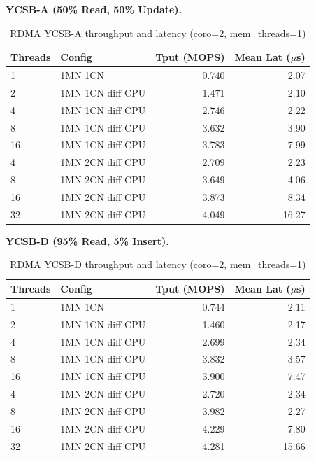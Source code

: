 \documentclass[conference]{IEEEtran}
\begin{document}
\textbf{YCSB-A (50\% Read, 50\% Update).}

\begin{table}[H]
\centering
\caption{RDMA YCSB-A throughput and latency (coro=2, mem\_threads=1)}
\label{tab:rdma-ycsba}
\small
\begin{tabular}{@{}llrr@{}}
\toprule
\textbf{Threads} & \textbf{Config} & \textbf{Tput (MOPS)} & \textbf{Mean Lat ($\mu$s)} \\
\midrule
1  & 1MN 1CN             & 0.740 & 2.07 \\
2  & 1MN 1CN diff CPU    & 1.471 & 2.10 \\
4  & 1MN 1CN diff CPU    & 2.746 & 2.22 \\
8  & 1MN 1CN diff CPU    & 3.632 & 3.90 \\
16 & 1MN 1CN diff CPU    & 3.783 & 7.99 \\
\midrule
4  & 1MN 2CN diff CPU    & 2.709 & 2.23 \\
8  & 1MN 2CN diff CPU    & 3.649 & 4.06 \\
16 & 1MN 2CN diff CPU    & 3.873 & 8.34 \\
32 & 1MN 2CN diff CPU    & 4.049 & 16.27 \\
\bottomrule
\end{tabular}
\end{table}

\textbf{YCSB-D (95\% Read, 5\% Insert).}

\begin{table}[H]
\centering
\caption{RDMA YCSB-D throughput and latency (coro=2, mem\_threads=1)}
\label{tab:rdma-ycsbd}
\small
\begin{tabular}{@{}llrr@{}}
\toprule
\textbf{Threads} & \textbf{Config} & \textbf{Tput (MOPS)} & \textbf{Mean Lat ($\mu$s)} \\
\midrule
1  & 1MN 1CN             & 0.744 & 2.11 \\
2  & 1MN 1CN diff CPU    & 1.460 & 2.17 \\
4  & 1MN 1CN diff CPU    & 2.699 & 2.34 \\
8  & 1MN 1CN diff CPU    & 3.832 & 3.57 \\
16 & 1MN 1CN diff CPU    & 3.900 & 7.47 \\
\midrule
4  & 1MN 2CN diff CPU    & 2.720 & 2.34 \\
8  & 1MN 2CN diff CPU    & 3.982 & 2.27 \\
16 & 1MN 2CN diff CPU    & 4.229 & 7.80 \\
32 & 1MN 2CN diff CPU    & 4.281 & 15.66 \\
\bottomrule
\end{tabular}
\end{table}
\end{document}
